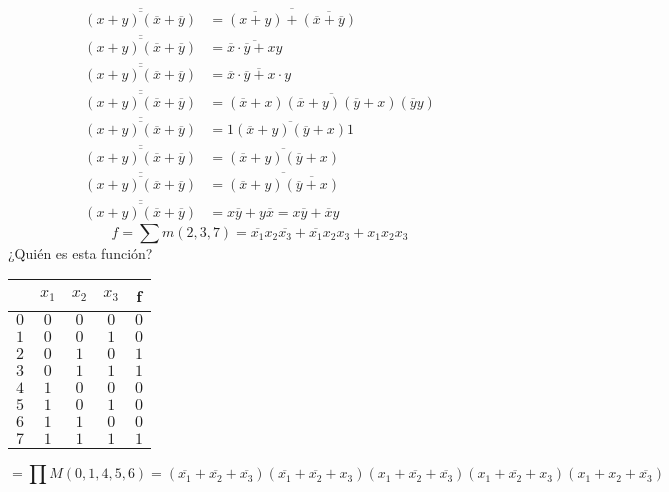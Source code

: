 \documentclass[12pt, twoside]{article}
\begin{document}
\begin{align*}
	\overline{\overline{(x+y)(\overline{x}+\overline{y})}} &=
	\overline{\overline{(x+y)}+\overline{(\overline{x}+\overline{y})}}\\
	\overline{\overline{(x+y)(\overline{x}+\overline{y})}} &=
	\overline{\overline{x}\cdot\overline{y}+xy}\\
	\overline{\overline{(x+y)(\overline{x}+\overline{y})}} &=
	\overline{\overline{x}\cdot\overline{y}+x\cdot y}\\
	\overline{\overline{(x+y)(\overline{x}+\overline{y})}} &=
	\overline{(\overline{x}+x)(\overline{x}+y)(\overline{y}+x)(\overline{y}y)}\\
	\overline{\overline{(x+y)(\overline{x}+\overline{y})}} &=
	\overline{1(\overline{x}+y)(\overline{y}+x)1}\\
	\overline{\overline{(x+y)(\overline{x}+\overline{y})}} &=
	\overline{(\overline{x}+y)(\overline{y}+x)}\\
	\overline{\overline{(x+y)(\overline{x}+\overline{y})}} &=
	\overline{(\overline{x}+y)\overline{(\overline{y}+x)}}\\
	\overline{\overline{(x+y)(\overline{x}+\overline{y})}} &=
	x\overline{y}+y\overline{x} = \boxed{x\overline{y}+\overline{x}y}
\end{align*}
\[f=\sum m(2,3,7)=\overline{x_1}x_2\overline{x_3}+\overline{x_1}x_2x_3+x_1x_2x_3\]
¿Quién es esta función?
\begin{center}
	\begin{tabular}{c|ccc|c|}
		& $x_1$ & $x_2$ & $x_3$ & f\\
		\hline
		$0$ & $0$ & $0$ & $0$ & $0$\\
		$1$ & $0$ & $0$ & $1$ & $0$\\
		$2$ & $0$ & $1$ & $0$ & $1$\\
		$3$ & $0$ & $1$ & $1$ & $1$\\
		$4$ & $1$ & $0$ & $0$ & $0$\\
		$5$ & $1$ & $0$ & $1$ & $0$\\
		$6$ & $1$ & $1$ & $0$ & $0$\\
		$7$ & $1$ & $1$ & $1$ & $1$\\
	\end{tabular}
\end{center}
\[=\prod M(0,1,4,5,6)=
	(\overline{x_1}+\overline{x_2}+\overline{x_3})
	(\overline{x_1}+\overline{x_2}+x_3)
	(x_1+\overline{x_2}+\overline{x_3})
	(x_1+\overline{x_2}+x_3)
	(x_1+x_2+\overline{x_3})
\]
\end{document}
